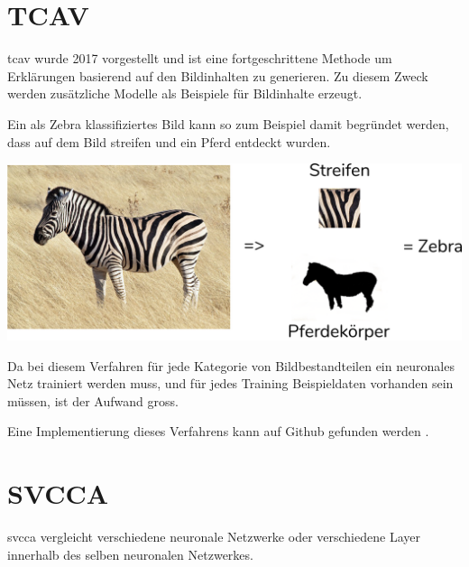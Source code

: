 \documentclass[
  12pt, %
  a4paper, %
  oneside, %
  openany, 
  numbers=noenddot, %
  BCOR=5mm, %
  parskip=half*, %
  thesis, %
]{bfhbook}
\begin{document}
\section{TCAV}
 \acrfull{tcav} wurde 2017 vorgestellt \parencite{Kim2017} und ist eine fortgeschrittene Methode um Erklärungen basierend auf den Bildinhalten zu generieren. Zu diesem Zweck werden zusätzliche Modelle als Beispiele für Bildinhalte erzeugt.
 
 Ein als Zebra klassifiziertes Bild kann so zum Beispiel damit begründet werden, dass auf dem Bild streifen und ein Pferd entdeckt wurden.
\begin{center}
\begin{minipage}[t]{\linewidth}
\includegraphics[width=\textwidth]{Bilder/Zebra-Explanation.PNG}
\end{minipage}
\end{center}
Da bei diesem Verfahren für jede Kategorie von Bildbestandteilen ein neuronales Netz trainiert werden muss, und für jedes Training Beispieldaten vorhanden sein müssen, ist der Aufwand gross. 

Eine Implementierung dieses Verfahrens kann auf Github gefunden werden \cite{tcavLink}.

\section{SVCCA}
\acrlong{svcca} \parencite{Raghu2017} vergleicht verschiedene neuronale Netzwerke oder verschiedene Layer innerhalb des selben neuronalen Netzwerkes.
\end{document}
